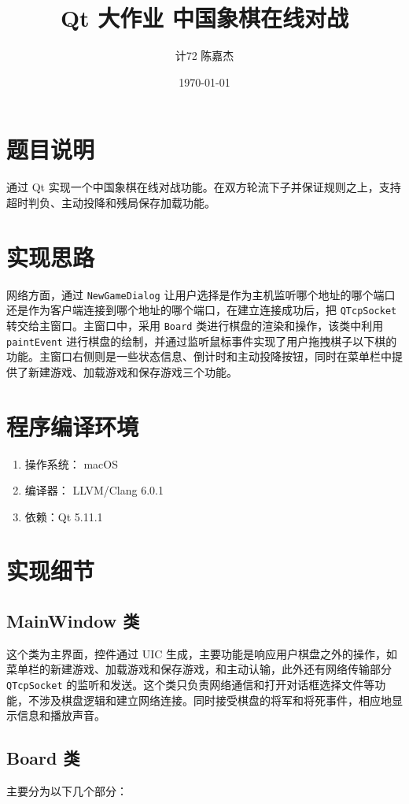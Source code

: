 \documentclass[11pt]{article}
\author{计72 陈嘉杰}
\date{\today}
\title{Qt 大作业 中国象棋在线对战}
\begin{document}
\maketitle
\tableofcontents

\section{题目说明}
\label{sec:orgf1f5ca6}
通过 Qt 实现一个中国象棋在线对战功能。在双方轮流下子并保证规则之上，支持超时判负、主动投降和残局保存加载功能。

\section{实现思路}
\label{sec:org0e90c63}
网络方面，通过 \texttt{NewGameDialog} 让用户选择是作为主机监听哪个地址的哪个端口还是作为客户端连接到哪个地址的哪个端口，在建立连接成功后，把 \texttt{QTcpSocket} 转交给主窗口。主窗口中，采用 \texttt{Board} 类进行棋盘的渲染和操作，该类中利用 \texttt{paintEvent} 进行棋盘的绘制，并通过监听鼠标事件实现了用户拖拽棋子以下棋的功能。主窗口右侧则是一些状态信息、倒计时和主动投降按钮，同时在菜单栏中提供了新建游戏、加载游戏和保存游戏三个功能。

\section{程序编译环境}
\label{sec:org178035b}
\begin{enumerate}
\item 操作系统： macOS
\item 编译器： LLVM/Clang 6.0.1
\item 依赖：Qt 5.11.1
\end{enumerate}

\section{实现细节}
\label{sec:orgae13955}
\subsection{MainWindow 类}
\label{sec:org3df3931}
这个类为主界面，控件通过 UIC 生成，主要功能是响应用户棋盘之外的操作，如菜单栏的新建游戏、加载游戏和保存游戏，和主动认输，此外还有网络传输部分 \texttt{QTcpSocket} 的监听和发送。这个类只负责网络通信和打开对话框选择文件等功能，不涉及棋盘逻辑和建立网络连接。同时接受棋盘的将军和将死事件，相应地显示信息和播放声音。
\subsection{Board 类}
\label{sec:orga8dc13f}
主要分为以下几个部分：
\end{document}
